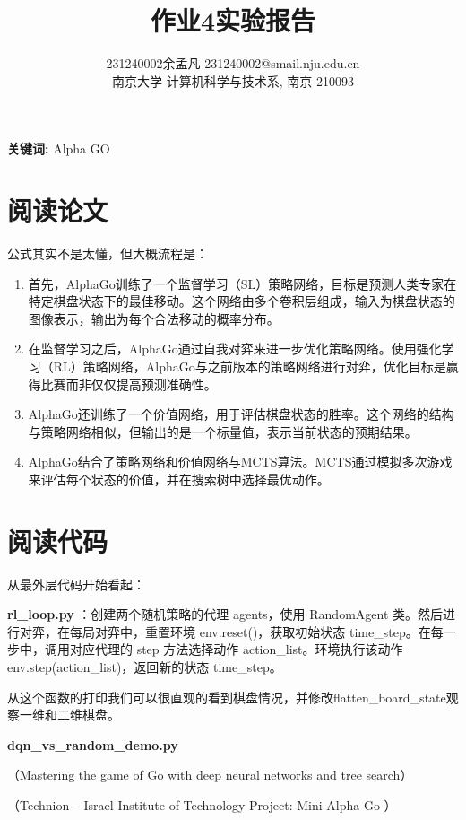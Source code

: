 \documentclass[a4paper, 12pt]{article}
\title{作业4实验报告}
\author{231240002余孟凡 231240002@smail.nju.edu.cn\\
	南京大学 计算机科学与技术系, 南京 210093}
\date{}
\begin{document}
  
	
	\maketitle  
	
	\begin{abstract}  

	\end{abstract}  
	
	\textbf{关键词:}   Alpha GO
	
	\section{阅读论文}
	
	公式其实不是太懂，但大概流程是：
	
	\begin{enumerate}
		\item 首先，AlphaGo训练了一个监督学习（SL）策略网络，目标是预测人类专家在特定棋盘状态下的最佳移动。这个网络由多个卷积层组成，输入为棋盘状态的图像表示，输出为每个合法移动的概率分布。
		\item 在监督学习之后，AlphaGo通过自我对弈来进一步优化策略网络。使用强化学习（RL）策略网络，AlphaGo与之前版本的策略网络进行对弈，优化目标是赢得比赛而非仅仅提高预测准确性。
		\item AlphaGo还训练了一个价值网络，用于评估棋盘状态的胜率。这个网络的结构与策略网络相似，但输出的是一个标量值，表示当前状态的预期结果。
		\item AlphaGo结合了策略网络和价值网络与MCTS算法。MCTS通过模拟多次游戏来评估每个状态的价值，并在搜索树中选择最优动作。
	\end{enumerate}
	
	\section{阅读代码}
	
	从最外层代码开始看起：
	
	\textbf{rl\_loop.py }：创建两个随机策略的代理 agents，使用 RandomAgent 类。然后进行对弈，在每局对弈中，重置环境 env.reset()，获取初始状态 time\_step。在每一步中，调用对应代理的 step 方法选择动作 action\_list。环境执行该动作 env.step(action\_list)，返回新的状态 time\_step。
	
	从这个函数的打印我们可以很直观的看到棋盘情况，并修改flatten\_board\_state观察一维和二维棋盘。
	
	\textbf{dqn\_vs\_random\_demo.py}

	
		
	
	  
	  
	
	（Mastering the game of Go with deep neural networks and tree search）
	
	（Technion – Israel Institute of Technology 	Project: Mini Alpha Go ）
		
	
\end{document}
